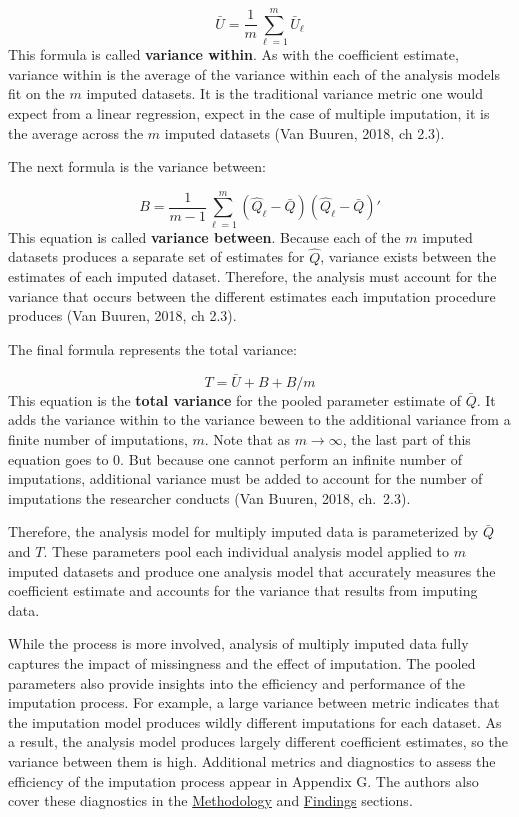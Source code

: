 \documentclass[12pt,oneside]{chicagocapstone}
\begin{document}
\[ \bar U = \frac{1}{m}\sum_{\ell=1}^m \bar U_\ell\] This formula is
called \textbf{variance within}. As with the coefficient estimate,
variance within is the average of the variance within each of the
analysis models fit on the \(m\) imputed datasets. It is the traditional
variance metric one would expect from a linear regression, expect in the
case of multiple imputation, it is the average across the \(m\) imputed
datasets (Van Buuren, 2018, ch 2.3).

The next formula is the variance between:

\[B = \frac{1}{m-1}\sum_{\ell=1}^m (\hat Q_\ell-\bar Q)(\hat Q_\ell-\bar Q)'\]
This equation is called \textbf{variance between}. Because each of the
\(m\) imputed datasets produces a separate set of estimates for
\(\hat Q\), variance exists between the estimates of each imputed
dataset. Therefore, the analysis must account for the variance that
occurs between the different estimates each imputation procedure
produces (Van Buuren, 2018, ch 2.3).

The final formula represents the total variance:

\[T = \bar U + B + B/m\] This equation is the \textbf{total variance}
for the pooled parameter estimate of \(\bar Q\). It adds the variance
within to the variance beween to the additional variance from a finite
number of imputations, \(m\). Note that as \(m \rightarrow \infty\), the
last part of this equation goes to \(0\). But because one cannot perform
an infinite number of imputations, additional variance must be added to
account for the number of imputations the researcher conducts (Van
Buuren, 2018, ch.~2.3).

Therefore, the analysis model for multiply imputed data is parameterized
by \(\bar Q\) and \(T\). These parameters pool each individual analysis
model applied to \(m\) imputed datasets and produce one analysis model
that accurately measures the coefficient estimate and accounts for the
variance that results from imputing data.

While the process is more involved, analysis of multiply imputed data
fully captures the impact of missingness and the effect of imputation.
The pooled parameters also provide insights into the efficiency and
performance of the imputation process. For example, a large variance
between metric indicates that the imputation model produces wildly
different imputations for each dataset. As a result, the analysis model
produces largely different coefficient estimates, so the variance
between them is high. Additional metrics and diagnostics to assess the
efficiency of the imputation process appear in Appendix G. The authors
also cover these diagnostics in the
\protect\hyperlink{methodology}{Methodology} and
\protect\hyperlink{findings}{Findings} sections.
\end{document}
